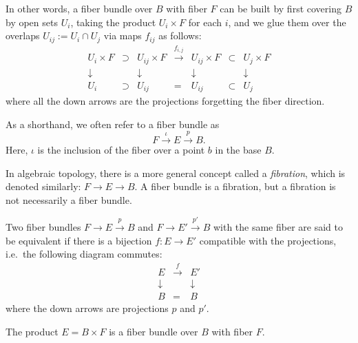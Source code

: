 \documentclass[12pt]{article}
\numberwithin{equation}{section}
\numberwithin{figure}{section}
\theoremstyle{remark}
\newtheorem{remark}[definition]{Remark}
\begin{document}
In other words, a fiber bundle over $B$ with fiber $F$
can be built by first covering $B$ by open sets $U_i$,
taking the product $U_i \times F$ for each $i$,
and we glue them over the overlaps $U_{ij}:=U_i\cap U_j$ via
maps $f_{ij}$ as follows:
\begin{equation}
  \begin{array}{cccccccc}
    U_i \times F &\supset& U_{ij}\times F & \xrightarrow{f_{i,j}} & 
    U_{ij}\times F & \subset & U_j\times F \\
    \downarrow & & \downarrow & & \downarrow & & \downarrow \\
    U_i & \supset & U_{ij} & = & U_{ij} & \subset & U_j
  \end{array}
\end{equation}
where all the down arrows are the projections forgetting the fiber direction.

\begin{notation}
  As a shorthand, we often refer to a fiber bundle as 
  \begin{equation}
  F\stackrel{\iota}{\longrightarrow} E\stackrel{p}{\longrightarrow} B.  
  \end{equation}  
  Here, $\iota$ is the inclusion of the fiber over a point $b$ in the base $B$.
\end{notation}

In algebraic topology, there is a more general concept called a \emph{fibration}, which is denoted similarly: $F\to E\to B$.
A fiber bundle is a fibration, but a fibration is not necessarily a fiber bundle.

\begin{definition}
  \label{def:bundle-equiv}
Two fiber bundles $F\to E\xrightarrow{p} B$ and $F\to E'\xrightarrow{p'} B$ with the same fiber
are said to be equivalent if there is a bijection $f: E\to E'$ 
compatible with the projections, i.e.~the following diagram commutes:
\begin{equation}
  \begin{array}{ccc}
    E & \xrightarrow{f} & E' \\
    \downarrow & & \downarrow \\
    B & = & B
  \end{array}
\end{equation}
where the down arrows are projections $p$ and $p'$.
\end{definition}

\begin{example}
  The product $E = B\times F$ is a fiber bundle over $B$ with fiber $F$.
\end{example}
\end{document}
